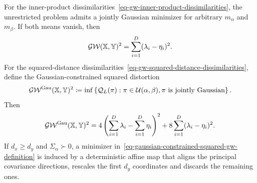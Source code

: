 \begin{prop}\label{prop-gw-between-gaussians}
	For the inner-product dissimilarities~\eqref{eq-gw-inner-product-dissimilarities}, the unrestricted problem admits a jointly Gaussian minimizer for arbitrary $m_\alpha$ and $m_\beta$. If both means vanish, then
	\begin{equation}\label{eq-centered-gaussian-inner-product-gw}
		\operatorname{\mathcal{GW}}(\mathbb{X},\mathbb{Y})^2
		=
		\sum_{i=1}^{D}(\lambda_i-\eta_i)^2.
	\end{equation}
	For the squared-distance dissimilarities~\eqref{eq-gw-squared-distance-dissimilarities}, define the Gaussian-constrained squared distortion
	\begin{equation}\label{eq-gaussian-constrained-squared-gw-definition}
		\operatorname{\mathcal{GW}}^{\mathrm{Gau}}(\mathbb{X},\mathbb{Y})^2
		\coloneqq
		\inf\left\{\mathcal Q_L(\pi):
		\pi\in\mathcal{U}(\alpha,\beta),
		\pi\text{ is jointly Gaussian}\right\}.
	\end{equation}
	Then
	\begin{equation}\label{eq-gaussian-constrained-squared-gw}
		\operatorname{\mathcal{GW}}^{\mathrm{Gau}}(\mathbb{X},\mathbb{Y})^2
		=
		4\left(\sum_{i=1}^{D}\lambda_i-\sum_{i=1}^{D}\eta_i\right)^2
		+8\sum_{i=1}^{D}(\lambda_i-\eta_i)^2.
	\end{equation}
	If $d_x\geq d_y$ and $\Sigma_\alpha\succ0$, a minimizer in~\eqref{eq-gaussian-constrained-squared-gw-definition} is induced by a deterministic affine map that aligns the principal covariance directions, rescales the first $d_y$ coordinates and discards the remaining ones.
\end{prop}
